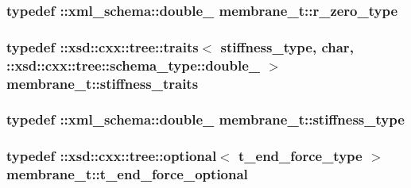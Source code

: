 \subsubsection[{\texorpdfstring{r\+\_\+zero\+\_\+type}{r_zero_type}}]{\setlength{\rightskip}{0pt plus 5cm}typedef \+::{\bf xml\+\_\+schema\+::double\+\_\+} {\bf membrane\+\_\+t\+::r\+\_\+zero\+\_\+type}}\hypertarget{classmembrane__t_ab1e0c179101c4b2916059925d73468ff}{}\label{classmembrane__t_ab1e0c179101c4b2916059925d73468ff}
\subsubsection[{\texorpdfstring{stiffness\+\_\+traits}{stiffness_traits}}]{\setlength{\rightskip}{0pt plus 5cm}typedef \+::xsd\+::cxx\+::tree\+::traits$<$ {\bf stiffness\+\_\+type}, char, \+::xsd\+::cxx\+::tree\+::schema\+\_\+type\+::double\+\_\+ $>$ {\bf membrane\+\_\+t\+::stiffness\+\_\+traits}}\hypertarget{classmembrane__t_a90e2a51b2f18f88127057a926cce542a}{}\label{classmembrane__t_a90e2a51b2f18f88127057a926cce542a}
\subsubsection[{\texorpdfstring{stiffness\+\_\+type}{stiffness_type}}]{\setlength{\rightskip}{0pt plus 5cm}typedef \+::{\bf xml\+\_\+schema\+::double\+\_\+} {\bf membrane\+\_\+t\+::stiffness\+\_\+type}}\hypertarget{classmembrane__t_a9e55619d3d02a55660849deaa0ca4338}{}\label{classmembrane__t_a9e55619d3d02a55660849deaa0ca4338}
\subsubsection[{\texorpdfstring{t\+\_\+end\+\_\+force\+\_\+optional}{t_end_force_optional}}]{\setlength{\rightskip}{0pt plus 5cm}typedef \+::xsd\+::cxx\+::tree\+::optional$<$ {\bf t\+\_\+end\+\_\+force\+\_\+type} $>$ {\bf membrane\+\_\+t\+::t\+\_\+end\+\_\+force\+\_\+optional}}\hypertarget{classmembrane__t_a7725d61ae95e124d402a8d9db7a08376}{}\label{classmembrane__t_a7725d61ae95e124d402a8d9db7a08376}

